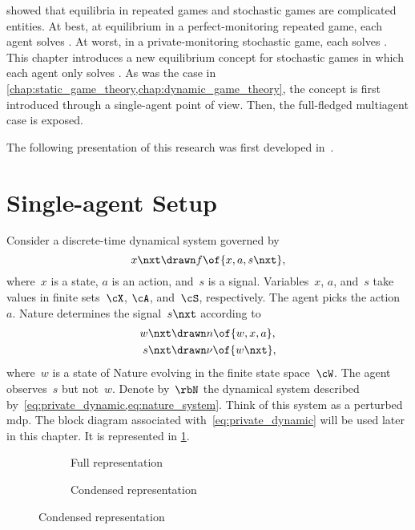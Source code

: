  showed that equilibria in repeated games and stochastic games are complicated entities.
At best, at equilibrium in a perfect-monitoring repeated game, each agent solves .
At worst, in a private-monitoring stochastic game, each solves .
This chapter introduces a new equilibrium concept for stochastic games in which each agent only solves .
As was the case in \cref{chap:static_game_theory,chap:dynamic_game_theory}, the concept is first introduced through a single-agent point of view.
Then, the full-fledged multiagent case is exposed.

The following presentation of this research was first developed in~\cite{dudebout_shamma:2012}.

\section{Single-agent Setup}

Consider a discrete-time dynamical system governed by
\begin{equation}
\label{eq:private_dynamic}
x\nxt \drawn  f \of{x, a, s\nxt},
\end{equation}
where~\(x\) is a state, \(a\) is an action, and~\(s\) is a signal.
Variables~\(x\), \(a\), and~\(s\) take values in finite sets~\(\cX\), \(\cA\), and~\(\cS\), respectively.
The agent picks the action~\(a\).
Nature determines the signal~\(s\nxt\) according to
\begin{subequations}
\label{eq:nature_system}
\begin{align}
\label{eq:nature_dynamic}
w\nxt &\drawn n \of{w, x, a}, \\
\label{eq:nature_signal}
s\nxt &\drawn \nu \of{w\nxt},
\end{align}
\end{subequations}
where~\(w\) is a state of Nature evolving in the finite state space~\(\cW\).
The agent observes~\(s\) but not~\(w\).
Denote by~\(\rbN\) the dynamical system described by~\cref{eq:private_dynamic,eq:nature_system}.
Think of this system as a perturbed \ac{mdp}.
The block diagram associated with~\cref{eq:private_dynamic} will be used later in this chapter.
It is represented in \cref{fig:block_diagram_mdp_with_signal_exploded}.

\begin{figure}[htp]
\begin{subfigure}[b]{0.5\textwidth}
\centering
{}
\caption{Full representation}
\end{subfigure}%
\begin{subfigure}[b]{0.5\textwidth}
\centering
{}
\caption{Condensed representation}
\end{subfigure}
\label{fig:block_diagram_mdp_with_signal_exploded}
\end{figure}


